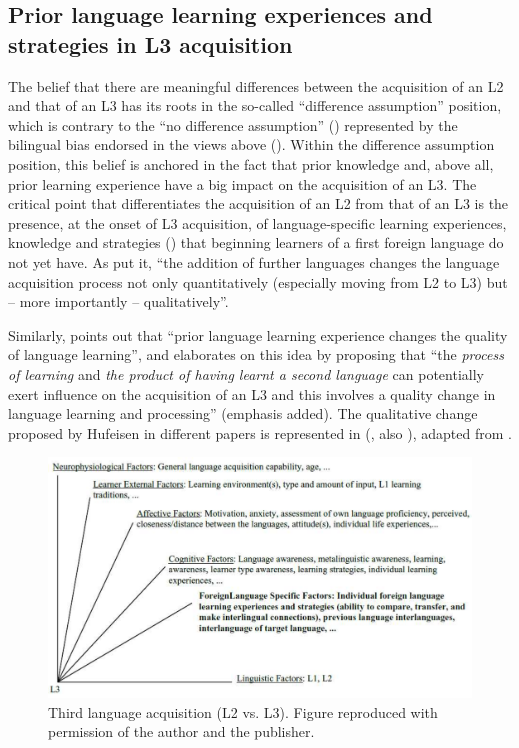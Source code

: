 \documentclass[output=paper]{../langscibook}
\begin{document}
\subsection{Prior language learning experiences and strategies in L3 acquisition}\label{sec:sanchez1:1.1}

The belief that there are meaningful differences between the acquisition of an L2 and that of an L3 has its roots in the so-called “difference assumption” position, which is contrary to the “no difference assumption” (\citealt{DeAngelis2007}) represented by the bilingual bias endorsed in the views above (\citealt{SharwoodSmith1994, MitchellMyles1998, Grosjean2010}). Within the difference assumption position, this belief is anchored in the fact that prior knowledge and, above all, prior learning experience have a big impact on the acquisition of an L3. The critical point that differentiates the acquisition of an L2 from that of an L3 is the presence, at the onset of L3 acquisition, of language-specific learning experiences, knowledge and strategies (\citealt{GibsonHufeisen2003}) that beginning learners of a first foreign language do not yet have. As \citet[145]{MarxHufeisen2004} put it, “the addition of further languages changes the language acquisition process not only quantitatively (especially moving from L2 to L3) but – more importantly – qualitatively”.

Similarly, \citet[207]{Jessner1999} points out that “prior language learning experience changes the quality of language learning”, and \citet[14]{Jessner2006} elaborates on this idea by proposing that “the \textit{process of learning} and \textit{the product of having learnt a second language} can potentially exert influence on the acquisition of an L3 and this involves a quality change in language learning and processing” (emphasis added). The qualitative change proposed by Hufeisen in different papers is represented in  (\citealt{Hufeisen1998}, also \citealt[145]{MarxHufeisen2004}), adapted from \citet[314]{HufeisenMarx2007}.

\begin{figure}
    \includegraphics[width=\textwidth]{figures/Sanchez1Figure1.png}
    \caption{Third language acquisition (L2 vs. L3). Figure reproduced with permission of the author and the publisher.\label{fig:sanchez1:1}}
\end{figure}
\end{document}
